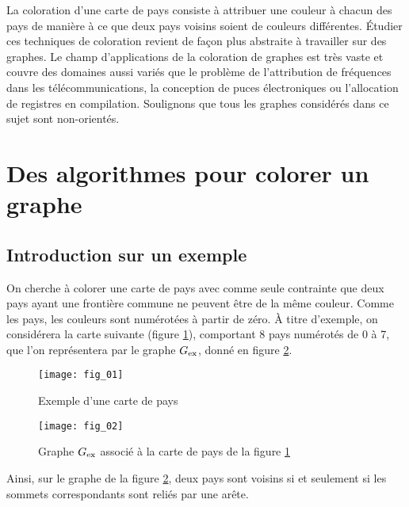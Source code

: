 
La coloration d'une carte de pays consiste à attribuer une couleur à chacun des pays de manière à ce que deux pays voisins soient de couleurs différentes.
Étudier ces techniques de coloration revient de façon plus abstraite à travailler sur des graphes.
Le champ d'applications de la coloration de graphes est très vaste et couvre des domaines aussi variés que le problème de l'attribution de fréquences dans les télécommunications, la conception de puces électroniques ou l'allocation de registres en compilation.
Soulignons que tous les graphes considérés dans ce sujet sont non-orientés. %

\section{Des algorithmes pour colorer un graphe \label{2024_CCINP_TSI_Info_sec_01}}
\subsection{Introduction sur un exemple \label{2024_CCINP_TSI_Info_sec_01_1}}
On cherche à colorer une carte de pays avec comme seule contrainte que deux pays ayant une frontière commune ne peuvent être de la même couleur.
Comme les pays, les couleurs sont numérotées à partir de zéro.
À titre d'exemple, on considérera la carte suivante (figure \ref{2024_CCINP_TSI_Info_fig_01}), comportant 8 pays numérotés de 0 à 7, que l'on représentera par le graphe ${G}_{\text{ex}}$, donné en figure \ref{2024_CCINP_TSI_Info_fig_02}.

\begin{figure}[!h]
\centering
\texttt{[image: fig\_01]}
\caption{Exemple d'une carte de pays \label{2024_CCINP_TSI_Info_fig_01}}
\end{figure}

\begin{figure}[!h]
\centering
\texttt{[image: fig\_02]}
\caption{Graphe ${G}_{\text{ex}}$ associé à la carte de pays de la figure \ref{2024_CCINP_TSI_Info_fig_01}\label{2024_CCINP_TSI_Info_fig_02}}
\end{figure}

Ainsi, sur le graphe de la figure \ref{2024_CCINP_TSI_Info_fig_02}, deux pays sont voisins si et seulement si les sommets correspondants sont reliés par une arête.



